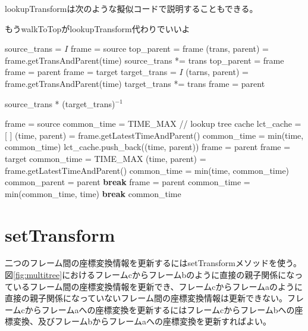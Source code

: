 \documentclass[a4paper]{jreport}	%
\begin{document}
lookupTransformは次のような擬似コードで説明することもできる。

もうwalkToTopがlookupTransform代わりでいいよ

\begin{algorithmic}[1]
	 
	\EndIf
	\State source\_trans = $I$
	\State frame = source
	\State top\_parent = frame
	\State (trans, parent) = frame.getTransAndParent(time) 
	\State source\_trans *= trans
	\State top\_parent = frame
	\State frame = parent
	\EndWhile
	\State frame = target
	\State target\_trans = $I$
	\State (tarns, parent) = frame.getTransAndParent(time)
	\State target\_trans *= trans
	\State frame = parent
	\EndWhile
	
	\Return source\_trans * (target\_trans)$^{-1}$
	\EndFunction
\end{algorithmic}



\begin{algorithmic}[1]
	\State frame = source
	\State common\_time = TIME\_MAX
	\State // lookup tree cache
	\State lct\_cache = [ ]
	\State (time, parent) = frame.getLatestTimeAndParent()
	\State common\_time = min(time, common\_time)
	\State lct\_cache.push\_back((time, parent))
	\State frame = parent
	\EndWhile
	\State frame = target
	\State common\_time = TIME\_MAX
	\State (time, parent) = frame.getLatestTimeAndParent()
	\State common\_time = min(time, common\_time)
	\State common\_parent = parent
	\State \textbf{break}
	\EndIf
	\State frame = parent
	\EndWhile
	\State common\_time = min(common\_time, time)
	\State \textbf{break}
	\EndIf
	\EndFor
	\Return common\_time
	\EndFunction
\end{algorithmic}





\section{setTransform}
二つのフレーム間の座標変換情報を更新するにはsetTransformメソッドを使う。図\ref{fig:multitree}におけるフレームcからフレームbのように直接の親子関係になっているフレーム間の座標変換情報を更新でき、フレームcからフレームaのように直接の親子関係になっていないフレーム間の座標変換情報は更新できない。フレームcからフレームaへの座標変換を更新するにはフレームcからフレームbへの座標変換、及びフレームbからフレームaへの座標変換を更新すればよい。
\end{document}
